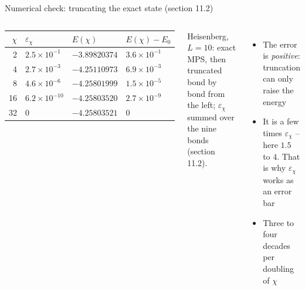 \documentclass[aspectratio=169,10pt]{beamer}
\begin{document}
\begin{frame}{Numerical check: truncating the exact state (section 11.2)}
  \begin{columns}[T]
    \begin{center}\small
    \begin{tabular}{@{}rlll@{}}\toprule
    $\chi$ & $\varepsilon_\chi$ & $E(\chi)$ & $E(\chi)-E_0$\\\midrule
    2 & $2.5\times10^{-1}$ & $-3.89820374$ & $3.6\times10^{-1}$\\
    4 & $2.7\times10^{-3}$ & $-4.25110973$ & $6.9\times10^{-3}$\\
    8 & $4.6\times10^{-6}$ & $-4.25801999$ & $1.5\times10^{-5}$\\
    16 & $6.2\times10^{-10}$ & $-4.25803520$ & $2.7\times10^{-9}$\\
    32 & 0 & $-4.25803521$ & 0\\\bottomrule
    \end{tabular}
    \end{center}
    \centering\scriptsize Heisenberg, $L=10$: exact MPS, then truncated bond by bond from the left; $\varepsilon_\chi$ summed over the nine bonds (section 11.2).
    \small
    \begin{itemize}
      \item The error is \emph{positive}: truncation can only raise the energy
      \item It is a few times $\varepsilon_\chi$ -- here $1.5$ to $4$. \alert{That is why $\varepsilon_\chi$ works as an error bar}
      \item Three to four decades per doubling of $\chi$
    \end{itemize}
  \end{columns}
\end{frame}
\end{document}
